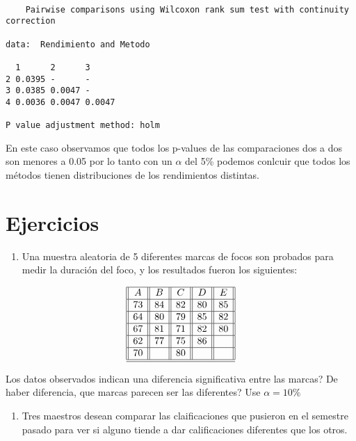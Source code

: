 \documentclass[a4paper,oneside,openany]{book}
\providecommand{\tightlist}{%
  \setlength{\itemsep}{0pt}\setlength{\parskip}{0pt}}
\begin{document}
\begin{verbatim}

    Pairwise comparisons using Wilcoxon rank sum test with continuity correction 

data:  Rendimiento and Metodo 

  1      2      3     
2 0.0395 -      -     
3 0.0385 0.0047 -     
4 0.0036 0.0047 0.0047

P value adjustment method: holm 
\end{verbatim}

En este caso observamos que todos los p-values de las comparaciones dos
a dos son menores a 0.05 por lo tanto con un \(\alpha\) del 5\% podemos
conlcuir que todos los métodos tienen distribuciones de los rendimientos
distintas.

\section{Ejercicios}\label{ejercicios-6}

\begin{enumerate}
\def\labelenumi{\arabic{enumi}.}
\tightlist
\item
  Una muestra aleatoria de 5 diferentes marcas de focos son probados
  para medir la duración del foco, y los resultados fueron los
  siguientes:
\end{enumerate}

\[
\begin{equation*}
\begin{array}{||c| |c| |c| |c||c||} 
\hline 
A & B&C&D&E \\ 
 \hline
73&84&82&80&85\\
 \hline
64&80&79&85&82\\
 \hline
67&81&71&82&80\\
 \hline
62&77&75&86&\\
 \hline
70&&80&&\\
\hline
\hline
\end{array}
\end{equation*}
\]

Los datos observados indican una diferencia significativa entre las
marcas? De haber diferencia, que marcas parecen ser las diferentes? Use
\(\alpha=10\%\)

\begin{enumerate}
\def\labelenumi{\arabic{enumi}.}
\setcounter{enumi}{1}
\tightlist
\item
  Tres maestros desean comparar las claificaciones que pusieron en el
  semestre pasado para ver si alguno tiende a dar calificaciones
  diferentes que los otros.
\end{enumerate}
\end{document}
